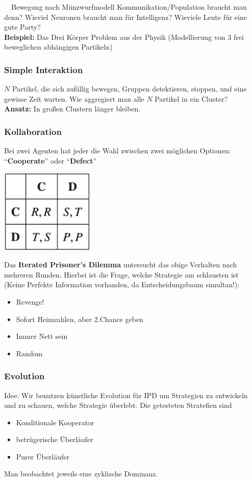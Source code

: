 \documentclass[a4paper]{article}
\begin{document}
\ \ Bewegung nach Münzwurfmodell Kommunikation/Population braucht man denn? Wieviel Neuronen braucht man für Intelligenz? Wieviele Leute für eine gute Party?\\
\textbf{Beispiel:} Das Drei Körper Problem aus der Physik (Modellierung von 3 frei beweglichen abhängigen Partikeln)
\subsubsection{Simple Interaktion}
$N$ Partikel, die sich zufällig bewegen, Gruppen detektieren, stoppen, und eine gewisse Zeit warten. Wie aggregiert man alle $N$ Partikel in ein Cluster?\\
\textbf{Ansatz:} In großen Clustern länger bleiben.
\subsubsection{Kollaboration}
Bei zwei Agenten hat jeder die Wahl zwischen zwei möglichen Optionen:\\
 ``\textbf{Cooperate}'' oder ``\textbf{Defect}''\\
\begin{center}
	\includegraphics[height = 4cm]{PrisonersDilemma.png}
\end{center}

 Das \textbf{Iterated Prisoner's Dilemma} untersucht das obige Verhalten nach mehreren Runden. Hierbei ist die Frage, welche Strategie am schlausten ist (Keine Perfekte Information vorhanden, da Entscheidungsbaum simultan!):
 \begin{itemize}
 	\item Revenge!
 	\item Sofort Heimzahlen, aber 2.Chance geben
 	\item Immer Nett sein
 	\item Random
 \end{itemize}
\subsubsection{Evolution}
Idee: Wir benutzen künstliche Evolution für IPD um Strategien zu entwickeln und zu schauen, welche Strategie überlebt. Die getesteten Stratefien sind
\begin{itemize}
	\item Konditionale Kooperator
	\item betrügerische Überläufer
	\item Purer Überläufer
\end{itemize}
Man beobachtet jeweils eine zyklische Dominanz.
\end{document}
